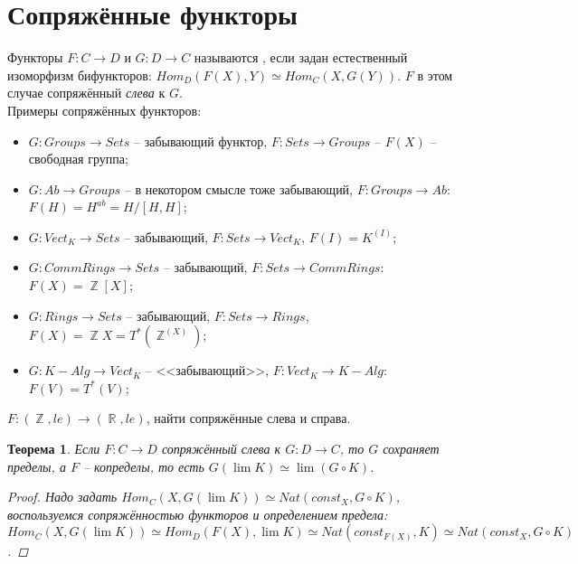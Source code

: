 \documentclass[a4paper]{article}
\theoremstyle{indented}
\newtheorem{theorem}{Теорема}
\theoremstyle{definition}
\theoremstyle{remark}
\DeclareMathOperator{\ZZ}{\mathbb{Z}}
\DeclareMathOperator{\RR}{\mathbb{R}}
\begin{document}
\section{Сопряжённые функторы}
 Функторы $F: C \longrightarrow D$ и $G: D \longrightarrow C$ называются , если задан естественный изоморфизм бифункторов: $Hom_D(F(X), Y) \simeq Hom_C(X, G(Y))$. $F$ в этом случае сопряжённый \textit{слева} к $G$.
\\Примеры сопряжённых функторов: \begin{itemize}
\item $G: Groups \longrightarrow Sets$ -- забывающий функтор, $F: Sets \longrightarrow Groups$ -- $F(X)$ -- свободная группа;
\item $G: Ab \longrightarrow Groups$ -- в некотором смысле тоже забывающий, $F: Groups \longrightarrow Ab$: $F(H) = H^{ab} = H/[H, H]$;
\item $G: Vect_K \longrightarrow Sets$ -- забывающий, $F: Sets \rightarrow Vect_K$, $F(I) = K^{(I)}$;
\item $G: CommRings \longrightarrow Sets$ -- забывающий, $F: Sets \longrightarrow CommRings$: $F(X) = \ZZ [X]$;
\item $G: Rings \longrightarrow Sets$ -- забывающий, $F: Sets \longrightarrow Rings$, $F(X) = \ZZ {X} = T^*(\ZZ ^{(X)})$;
\item $G: K-Alg \longrightarrow Vect_K$ -- <<забывающий>>, $F: Vect_K \longrightarrow K-Alg$: $F(V) = T^*(V)$;
\end{itemize}
\exer $F: (\ZZ, le) \longrightarrow (\RR, le)$, найти сопряжённые слева и справа.
\begin{theorem}
Если $F: C \longrightarrow D$ сопряжённый слева к $G: D \longrightarrow C$, то $G$ сохраняет пределы, а $F$ -- копределы, то есть $G(\lim K) \simeq \lim (G \circ K)$.  
\begin{proof}
Надо задать $Hom_C(X, G(\lim K)) \simeq Nat(const_X, G \circ K)$, воспользуемся сопряжённостью функторов и определением предела: $Hom_C(X, G(\lim K)) \simeq Hom_D(F(X), \lim K) \simeq Nat(const_{F(X)}, K) \simeq Nat(const_X, G \circ K)$. 
\end{proof}
\end{theorem}
\end{document}
